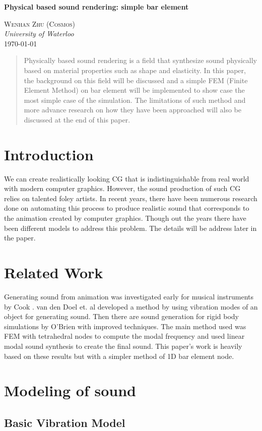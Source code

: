 \documentclass[11pt]{article}
\renewcommand{\maketitle}{
    \begin{flushright}
        {\LARGE \textbf{Physical based sound rendering: simple bar element}}


    {\large \textsc{Wenhan Zhu (Cosmos)} \\ \textit{University of Waterloo}}
    \\ \today

    \end{flushright}
}
\begin{document}
\maketitle

\begin{abstract}
    Physically based sound rendering is a field that synthesize sound physically based on material properties such as shape and elasticity. In this paper, the background on this field will be discussed and a simple FEM (Finite Element Method) on bar element will be implemented to show case the most simple case of the simulation. The limitations of such method and more advance research on how they have been approached will also be discussed at the end of this paper.
\end{abstract}

\section*{Introduction}
We can create realistically looking CG that is indistinguishable from real world with modern computer graphics. However, the sound production of such CG relies on talented foley artists. In recent years, there have been numerous research done on automating this process to produce realistic sound that corresponds to the animation created by computer graphics. Though out the years there have been different models to address this problem. The details will be address later in the paper.



\section*{Related Work}
Generating sound from animation was investigated early for musical instruments by Cook \cite{Cook7}. van den Doel et. al \cite{Doel1996} \cite{Doel1998} developed a method by using vibration modes of an object for generating sound. Then there are sound generation for rigid body simulations by O'Brien \cite{Brien2002} with improved techniques. The main method used was FEM with tetrahedral nodes to compute the modal frequency and used linear modal sound synthesis to create the final sound. This paper's work is heavily based on these results but with a simpler method of 1D bar element node.

\section*{Modeling of sound}
\subsection*{Basic Vibration Model}
\end{document}
